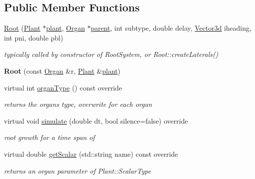 \subsection*{Public Member Functions}
\begin{DoxyCompactItemize}
\item 
\hyperlink{classCPlantBox_1_1Root_a9192f7ecf7ee409e8089365175b53f25}{Root} (\hyperlink{classCPlantBox_1_1Plant}{Plant} $\ast$\hyperlink{classCPlantBox_1_1Organ_ac614456886ab270c6fd2617403e0f306}{plant}, \hyperlink{classCPlantBox_1_1Organ}{Organ} $\ast$\hyperlink{classCPlantBox_1_1Organ_a8ad90078d5ef859bd2ab71700854e286}{parent}, int subtype, double delay, \hyperlink{classCPlantBox_1_1Vector3d}{Vector3d} iheading, int pni, double pbl)
\begin{DoxyCompactList}\small\item\em typically called by constructor of Root\+System, or Root\+::create\+Laterals() \end{DoxyCompactList}\item 
\mbox{\label{classCPlantBox_1_1Root_a94270c0a8bece399bc44f4161d8c85fd}} 
{\bfseries Root} (const \hyperlink{classCPlantBox_1_1Organ}{Organ} \&r, \hyperlink{classCPlantBox_1_1Plant}{Plant} \&\hyperlink{classCPlantBox_1_1Organ_ac614456886ab270c6fd2617403e0f306}{plant})
\item 
\mbox{\label{classCPlantBox_1_1Root_a878211cbc8aea4127b288ffc82222f02}} 
virtual int \hyperlink{classCPlantBox_1_1Root_a878211cbc8aea4127b288ffc82222f02}{organ\+Type} () const override
\begin{DoxyCompactList}\small\item\em returns the organs type, overwrite for each organ \end{DoxyCompactList}\item 
virtual void \hyperlink{classCPlantBox_1_1Root_af2fa9d229ab05897214e0ec224f0ae71}{simulate} (double dt, bool silence=false) override
\begin{DoxyCompactList}\small\item\em root growth for a time span of \end{DoxyCompactList}\item 
virtual double \hyperlink{classCPlantBox_1_1Root_a23fac3d7c3b15e5f270d76b56c693ab9}{get\+Scalar} (std\+::string name) const override
\begin{DoxyCompactList}\small\item\em returns an organ parameter of Plant\+::\+Scalar\+Type \end{DoxyCompactList}\item 

\end{DoxyCompactItemize}
